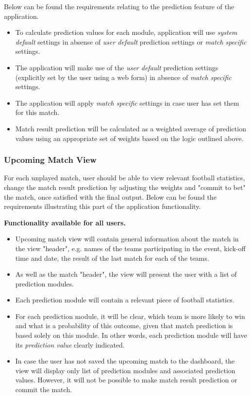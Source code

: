 Below can be found the requirements relating to the prediction feature of the application.

\begin{itemize}
  \item To calculate prediction values for each module, application will use \emph{system default} settings in absense of \emph{user default} prediction settings or \emph{match specific} settings.
  \item The application will make use of the \emph{user default} prediction settings (explicitly set by the user using a web form) in absence of \emph{match specific} settings.
  \item The application will apply \emph{match specific} settings in case user has set them for this match.
  \item Match result prediction will be calculated as a weighted average of prediction values using an appropriate set of weights based on the logic outlined above.
\end{itemize}

\subsubsection{Upcoming Match View}
\label{subsubsec:upcomingmatch_req}
For each unplayed match, user should be able to view relevant football statistics, change the match result prediction by adjusting the weights and "commit to bet" the match, once satisfied with the final output. Below can be found the requirements illustrating this part of the application functionality.

\textbf{Functionality available for all users.}
\begin{itemize}
	 \item Upcoming match view will contain general information about the match in the view "header", e.g. names of the teams participating in the event, kick-off time and date, the result of the last match for each of the teams.
    \item As well as the match "header", the view will present the user with a list of prediction modules.
    \item Each prediction module will contain a relevant piece of football statistics.
    \item For each prediction module, it will be clear, which team is more likely to win and what is a probability of this outcome, given that match prediction is based solely on this module. In other words, each prediction module will have its \emph{prediction value} clearly indicated.
    \item In case the user has not saved the upcoming match to the dashboard, the view will display only list of prediction modules and associated prediction values. However, it will not be possible to make match result prediction or commit the match.
   \end{itemize}
   
